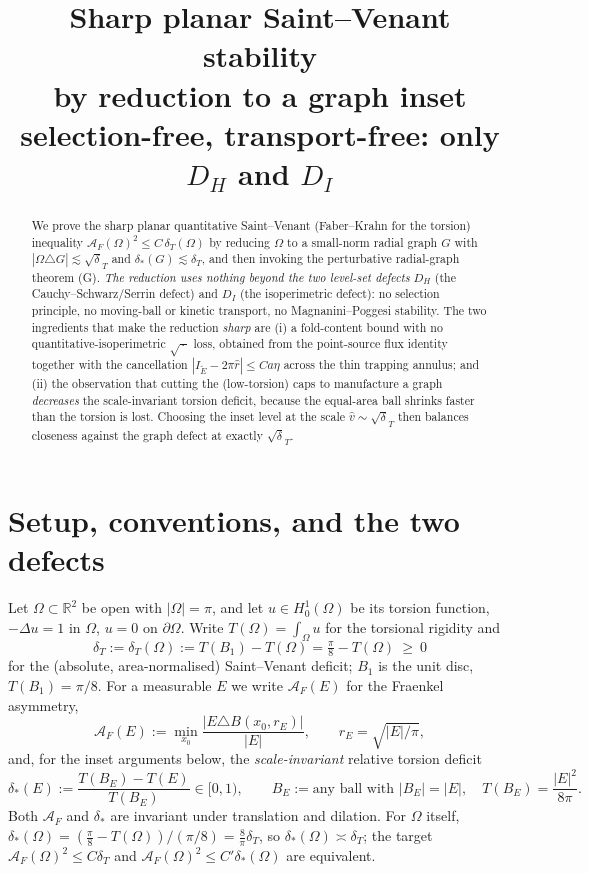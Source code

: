 \documentclass[11pt]{article}
\title{Sharp planar Saint--Venant stability\\
by reduction to a graph inset\\
\large selection-free, transport-free: only $D_H$ and $D_I$}
\author{}
\date{}
\theoremstyle{definition}
\newcommand{\R}{\mathbb R}
\newcommand{\Om}{\Omega}
\newcommand{\dT}{\delta_T}
\newcommand{\AF}{\mathcal A_F}
\newcommand{\Etil}{\widetilde E}
\newcommand{\abs}[1]{\left|#1\right|}
\newcommand{\dstar}{\delta_{*}}
\begin{document}
\maketitle

\begin{abstract}
We prove the sharp planar quantitative Saint--Venant (Faber--Krahn for the
torsion) inequality $\AF(\Om)^2\le C\,\dT(\Om)$ by reducing $\Om$ to a
small-norm radial graph $G$ with $\abs{\Om\triangle G}\lesssim\sqrt\dT$ and
$\dstar(G)\lesssim\dT$, and then invoking the perturbative radial-graph
theorem (G). \emph{The reduction uses nothing beyond the two level-set
defects} $D_H$ (the Cauchy--Schwarz/Serrin defect) and $D_I$ (the
isoperimetric defect): no selection principle, no moving-ball or kinetic
transport, no Magnanini--Poggesi stability. The two ingredients that make
the reduction \emph{sharp} are (i) a fold-content bound with no
quantitative-isoperimetric $\sqrt{\,\cdot\,}$ loss, obtained from the
point-source flux identity together with the cancellation
$\abs{I_{\Etil}-2\pi\hat r}\le C a\eta$ across the thin trapping annulus; and
(ii) the observation that cutting the (low-torsion) caps to manufacture a
graph \emph{decreases} the scale-invariant torsion deficit, because the
equal-area ball shrinks faster than the torsion is lost. Choosing the inset
level at the scale $\hat v\sim\sqrt\dT$ then balances closeness against the
graph defect at exactly $\sqrt\dT$.
\end{abstract}

\tableofcontents

\section{Setup, conventions, and the two defects}
\label{sec:setup}

Let $\Om\subset\R^2$ be open with $\abs\Om=\pi$, and let $u\in
H^1_0(\Om)$ be its torsion function, $-\Delta u=1$ in $\Om$, $u=0$ on
$\partial\Om$. Write $T(\Om)=\int_\Om u$ for the torsional rigidity and
\[
   \dT:=\dT(\Om):=T(B_1)-T(\Om)=\tfrac\pi8-T(\Om)\ \ge\ 0
\]
for the (absolute, area-normalised) Saint--Venant deficit; $B_1$ is the unit
disc, $T(B_1)=\pi/8$. For a measurable $E$ we write $\AF(E)$ for the
Fraenkel asymmetry,
\[
   \AF(E):=\min_{x_0}\frac{\abs{E\triangle B(x_0,r_E)}}{\abs E},\qquad
   r_E=\sqrt{\abs E/\pi},
\]
and, for the inset arguments below, the \emph{scale-invariant} relative
torsion deficit
\begin{equation}\label{eq:dstar}
   \dstar(E):=\frac{T(B_E)-T(E)}{T(B_E)}\in[0,1),\qquad
   B_E:=\text{any ball with }\abs{B_E}=\abs E,\quad T(B_E)=\frac{\abs E^2}{8\pi}.
\end{equation}
Both $\AF$ and $\dstar$ are invariant under translation and dilation. For
$\Om$ itself, $\dstar(\Om)=(\tfrac\pi8-T(\Om))/(\pi/8)=\tfrac8\pi\dT$, so
$\dstar(\Om)\asymp\dT$; the target $\AF(\Om)^2\le C\dT$ and
$\AF(\Om)^2\le C'\dstar(\Om)$ are equivalent.
\end{document}
